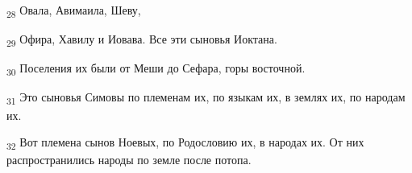 \begin{tcolorbox}
\textsubscript{28} Овала, Авимаила, Шеву,
\end{tcolorbox}
\begin{tcolorbox}
\textsubscript{29} Офира, Хавилу и Иовава. Все эти сыновья Иоктана.
\end{tcolorbox}
\begin{tcolorbox}
\textsubscript{30} Поселения их были от Меши до Сефара, горы восточной.
\end{tcolorbox}
\begin{tcolorbox}
\textsubscript{31} Это сыновья Симовы по племенам их, по языкам их, в землях их, по народам их.
\end{tcolorbox}
\begin{tcolorbox}
\textsubscript{32} Вот племена сынов Ноевых, по Родословию их, в народах их. От них распространились народы по земле после потопа.
\end{tcolorbox}
